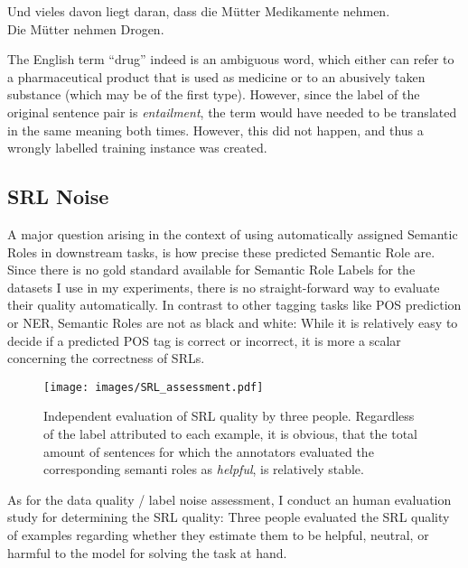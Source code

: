 {\begin{examples}
  \item Und vieles davon liegt daran, dass die Mütter Medikamente nehmen.\\
        Die Mütter nehmen Drogen.
\end{examples}

The English term ``drug'' indeed is an ambiguous word, which either can refer to a pharmaceutical
product that is used as medicine or to an abusively taken substance (which may be of the first
type). However, since
the label of the original sentence pair is \emph{entailment}, the term would have needed
to be translated in the same meaning both times. However, this did not happen, and thus
a wrongly labelled training instance was created.



\subsection{SRL Noise}
\label{sec:srl-noise}

A major question arising in the context of using automatically assigned Semantic Roles in
downstream tasks, is how precise these predicted Semantic Role are. Since there is no gold standard
available for Semantic Role Labels for the datasets I use in my experiments, there is no
straight-forward way to evaluate their quality {\color{red} automatically}. In contrast to
other tagging tasks like POS prediction or NER, Semantic Roles are not as black and white:
While it is relatively easy to decide if a predicted POS tag is correct or incorrect, it
is more a scalar concerning the correctness of SRLs.

\begin{wrapfigure}[19]{l}{0.65\linewidth}
  \begin{center}
    \texttt{[image: images/SRL\_assessment.pdf]}
  \end{center}
  \caption[SRL assessment]{Independent evaluation of SRL quality by three people. Regardless of the
    label attributed to each example, it is obvious, that the total amount of sentences for which the
    annotators evaluated the corresponding semanti roles as \emph{helpful}, is relatively stable.}
    \label{fig:SRL-assessment}
\end{wrapfigure}

As for the data quality / label noise assessment, I conduct an human evaluation study
for determining the SRL quality: Three people evaluated the SRL quality of examples regarding
whether they estimate them to be helpful, neutral, or harmful to the model for solving
the task at hand.

}
